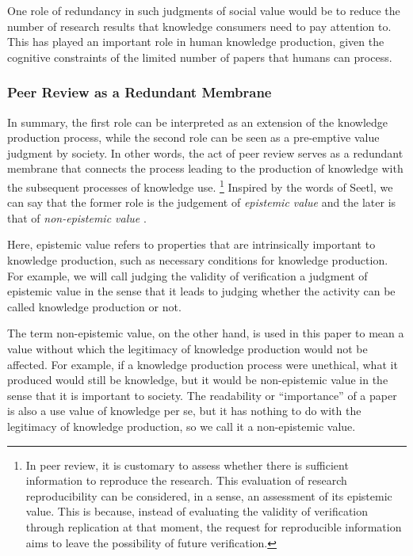 \documentclass{book}
\begin{document}
One role of redundancy in such judgments of social value would be to reduce the number of research results that knowledge consumers need to pay attention to. This has played an important role in human knowledge production, given the cognitive constraints of the limited number of papers that humans can process.

\subsubsection{Peer Review as a Redundant Membrane}

In summary, the first role can be interpreted as an extension of the knowledge production process, while the second role can be seen as a pre-emptive value judgment by society. In other words, the act of peer review serves as a redundant membrane that connects the process leading to the production of knowledge with the subsequent processes of knowledge use. \footnote{
In peer review, it is customary to assess whether there is sufficient information to reproduce the research. This evaluation of research reproducibility can be considered, in a sense, an assessment of its epistemic value. This is because, instead of evaluating the validity of verification through replication at that moment, the request for reproducible information aims to leave the possibility of future verification.
} Inspired by the words of Seetl, we can say that the former role is the judgement of \textit{epistemic value} and the later is that of \textit{non-epistemic value} \cite{steel2010epistemic}. 

Here, epistemic value refers to properties that are intrinsically important to knowledge production, such as necessary conditions for knowledge production. For example, we will call judging the validity of verification a judgment of epistemic value in the sense that it leads to judging whether the activity can be called knowledge production or not. 

The term non-epistemic value, on the other hand, is used in this paper to mean a value without which the legitimacy of knowledge production would not be affected. For example, if a knowledge production process were unethical, what it produced would still be knowledge, but it would be non-epistemic value in the sense that it is important to society. The readability or ``importance'' of a paper is also a use value of knowledge per se, but it has nothing to do with the legitimacy of knowledge production, so we call it a non-epistemic value.
\end{document}
